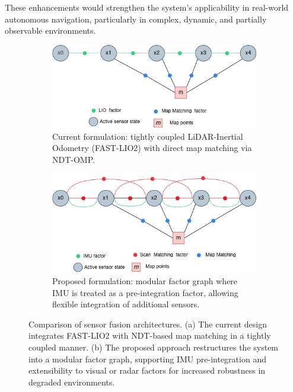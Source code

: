 These enhancements would strengthen the system’s applicability in real-world autonomous navigation, particularly in complex, dynamic, and partially observable environments.

\begin{figure}[H]
	\centering
	\begin{subfigure}[t]{0.7\textwidth}
		\includegraphics[width=\linewidth]{images/current_factor.drawio.png}
		\caption{Current formulation: tightly coupled LiDAR-Inertial Odometry (FAST-LIO2) with direct map matching via NDT-OMP.}
		\label{fig:current_sensor_fusion}
	\end{subfigure}
	\hfill
	\begin{subfigure}[t]{0.7\textwidth}
		\includegraphics[width=\linewidth]{images/proposed.drawio.png}
		\caption{Proposed formulation: modular factor graph where IMU is treated as a pre-integration factor, allowing flexible integration of additional sensors.}
		\label{fig:proposed_sensor_fusion}
	\end{subfigure}
	
	\caption{Comparison of sensor fusion architectures. (a) The current design integrates FAST-LIO2 with NDT-based map matching in a tightly coupled manner. (b) The proposed approach restructures the system into a modular factor graph, supporting IMU pre-integration and extensibility to visual or radar factors for increased robustness in degraded environments.}
	\label{fig:sensor_formulation}
\end{figure}

